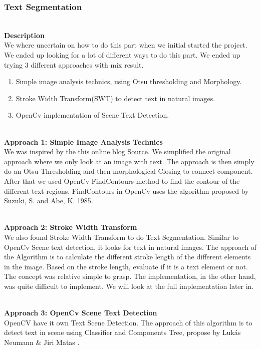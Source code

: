 \documentclass[11pt,a4paper,UKenglish]{article}
\begin{document}
\subsubsection{Text Segmentation}\label{Component_Descripton:Text_segmentation}
\noindent \\ \textbf{Description}
\noindent \\ We where uncertain on how to do this part when we initial started the project. We ended up looking for a lot of different ways to do this part. We ended up trying 3 different approaches with mix result.
\begin{enumerate}
  \item Simple image analysis technics, using Otsu thresholding and Morphology.
  \item Stroke Width Transform(SWT) to detect text in natural images.
  \item OpenCv implementation of Scene Text Detection.
\end{enumerate}

\noindent \\ \textbf{Approach 1: Simple Image Analysis Technics}
\noindent \\ We was inspired by the this online blog \href{https://www.danvk.org/2015/01/07/finding-blocks-of-text-in-an-image-using-python-opencv-and-numpy.html}{Source}\cite{_finding_????}. We simplified the original approach where we only look at an image with text. The approach is then simply do an Otsu Thresholding and then morphological Closing to connect component. After that we used OpenCv FindContours method to find the contour of the different text regions. FindContours in OpenCv uses the algorithm proposed by Suzuki, S. and Abe, K. 1985\cite{suzuki_topological_????}.

\noindent \\ \textbf{Approach 2: Stroke Width Transform}
\noindent \\ We also found Stroke Width Transform to do Text Segmentation\cite{epshtein_stroke_2010}. Similar to OpenCv Scene text detection, it looks for text in natural images. The approach of the Algorithm is to calculate the different stroke length of the different elements in the image. Based on the stroke length, evaluate if it is a text element or not. The concept was relative simple to grasp. The implementation, in the other hand, was quite difficult to implement. We will look at the full implementation later in.

\noindent \\ \textbf{Approach 3: OpenCv Scene Text Detection}
\noindent \\ OpenCV have it own Text Scene Detection. The approach of this algorithm is to detect text in scene using Classifier and Components Tree, propose by Lukás Neumann \& Jiri Matas \cite{neumann_real-time_2012}.
\end{document}
